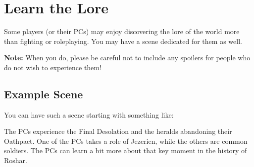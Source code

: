\section{Learn the Lore}
\label{sec:learnTheLore}

Some players (or their PCs) may enjoy discovering the lore of the world more than fighting or roleplaying. You may have a scene dedicated for them as well.

\textbf{Note:} When you do, please be careful not to include any spoilers for people who do not wish to experience them!



\subsection{Example Scene}

You can have such a scene starting with something like:


The PCs experience the Final Desolation and the heralds abandoning their Oathpact. One of the PCs takes a role of Jezerien, while the others are common soldiers. The PCs can learn a bit more about that key moment in the history of Roshar.